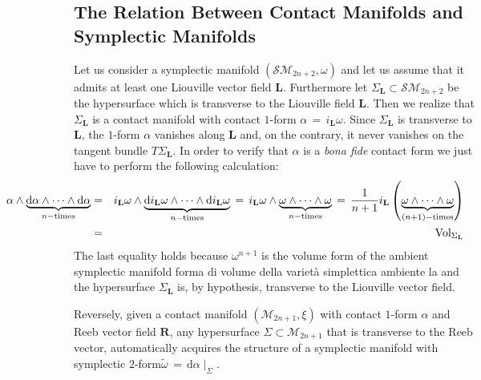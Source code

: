 \documentclass[10pt,a4paper]{article}
\def\tilde{\widetilde}
\begin{document}
\subsection{The Relation Between Contact Manifolds and Symplectic Manifolds}
\label{liasone} Let us consider a symplectic manifold $\left(
\mathcal{SM}_{2n+2},\omega\right)$  and let us assume that it admits at least one Liouville vector field
 $\mathbf{L}$. Furthermore let
$\Sigma_{\mathbf{L}}\subset \mathcal{SM}_{2n+2} $ be the hypersurface which is transverse
to the  Liouville field $\mathbf{L}$. Then we realize that
 $\Sigma_{\mathbf{L}}$ is a contact manifold
with contact $1$-form  $\alpha \, =
\,i_{\mathbf{L}}\omega$. Since $\Sigma_{\mathbf{L}}$ is
transverse to $\mathbf{L}$, the $1$-form $\alpha$ vanishes along
$\mathbf{L}$ and, on the contrary,  it never vanishes on the tangent bundle
$T\Sigma_{\mathbf{L}}$. In order to verify that  $\alpha$ is a \textit{bona fide}
contact form we just have to perform the following calculation:
\begin{eqnarray}\label{gelso}
 \hspace{-72pt}   \alpha\wedge \underbrace{\mathrm{d}\alpha \wedge \dots \wedge
    \mathrm{d}\alpha}_{n-\text{times}} & = & i_\mathbf{L}\omega\wedge\underbrace{\mathrm{d} i_\mathbf{L}\omega \wedge \dots \wedge
    \mathrm{d} i_\mathbf{L}\omega}_{n-\text{times}}\,=\,i_\mathbf{L}\omega\wedge\underbrace{\omega \wedge \dots \wedge
    \omega}_{n-\text{times}}\, = \, \frac{1}{n+1} i_\mathbf{L}\left(\underbrace{\omega \wedge \dots \wedge
    \omega}_{(n+1)-\text{times}}
    \right)\nonumber\\
    & = & \text{Vol}_{\Sigma_\mathbf{L}}\nonumber\\
\end{eqnarray}
The last equality holds because  $\omega^{n+1}$ is the volume form of the ambient  symplectic manifold
forma di volume  della variet\`{a} simplettica ambiente la
and the hypersurface  $\Sigma_\mathbf{L}$ is, by hypothesis, transverse to the Liouville vector field.
\par
Reversely, given a contact manifold
$\left(\mathcal{M}_{2n+1},\xi\right)$  with contact $1$-form $\alpha$
and Reeb vector field $\mathbf{R}$, any hypersurface $\Sigma
\subset \mathcal{M}_{2n+1}$ that is  transverse to the Reeb vector,
automatically acquires the structure of a symplectic manifold
with symplectic  $2$-form$\tilde{\omega}\, = \,
\mathrm{d}\alpha\mid_\Sigma$.
\par
\end{document}
